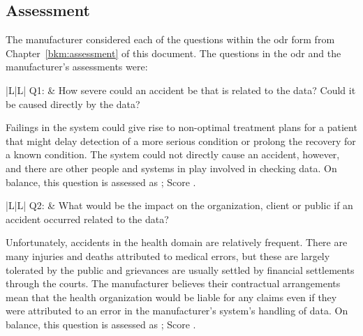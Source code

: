 \subsection{ Assessment}
The manufacturer considered each of the questions within the \gls{odr} form from Chapter~\autoref{bkm:assessment} of this document.
The questions in the \gls{odr} and the manufacturer's assessments were:


\addtocounter{table}{-1} %
\begin{longtable*}[H]
	{|L{}|L{}|}
	\hline
	Q1: & How severe could an accident be that is related to the data? Could it be caused directly by the data?\\
	\hline
\end{longtable*}

Failings in the system could give rise to non-optimal treatment plans for a patient that might delay detection of a more serious condition or prolong the recovery for a known condition. The system could not directly cause an accident, however, and there are other people and systems in play involved in checking data. On balance, this question is assessed as ; Score .

\addtocounter{table}{-1} %
\begin{longtable*}[H]
	{|L{}|L{}|}
	\hline
	Q2: & What would be the impact on the organization, client or public if an accident occurred related to the data?\\
	\hline
\end{longtable*}

Unfortunately, accidents in the health domain are relatively frequent. There are many injuries and deaths attributed to medical errors, but these are largely tolerated by the public and grievances are usually settled  by financial settlements through the courts. The manufacturer believes their contractual arrangements mean that the health organization would be liable for any claims even if they were attributed to an error in the manufacturer's system's handling of data. On balance, this question is assessed as ; Score .

